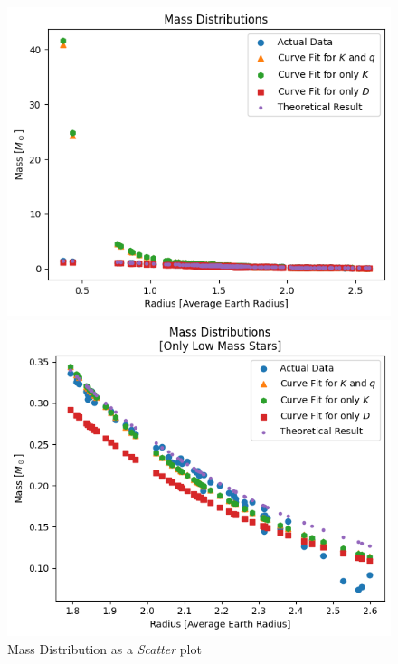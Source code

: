 \documentclass[letterpaper,12pt]{article}
\begin{document}
\begin{figure}[H]
\begin{minipage}{.5\textwidth}
\centerline{\includegraphics[width=\linewidth]{figures/appendix/2_1_11_n_s_ms_r.png}}
\end{minipage}
\begin{minipage}{.5\textwidth}
\centerline{\includegraphics[width=\linewidth]{figures/appendix/2_1_12_n_s_ms_r_.png}}
\end{minipage}
\caption{Mass Distribution as a \textit{Scatter} plot}
\end{figure}
\end{document}
